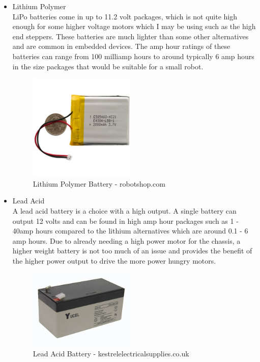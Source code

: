 \begin{itemize}
\item Lithium Polymer
\\LiPo batteries come in up to 11.2 volt packages, which is not quite high enough for some higher voltage motors which I may be using such as the high end steppers.  These batteries are much lighter than some other alternatives and are common in embedded devices.  The amp hour ratings of these batteries can range from 100 milliamp hours to around typically 6 amp hours in the size packages that would be suitable for a small robot.
\begin{figure}[H]
\centering
        \includegraphics[width=2.0in] {Images/lipo-front.jpg}
        \caption{Lithium Polymer Battery - robotshop.com}
        \label{Lithium Polymer Battery}
\end{figure}

\item Lead Acid
\\A lead acid battery is a choice with a high output.  A single battery can output 12 volts and can be found in high amp hour packages such as 1 - 40amp hours compared to the lithium alternatives which are around 0.1 - 6 amp hours.  Due to already needing a high power motor for the chassis, a higher weight battery is not too much of an issue and provides the benefit of the higher power output to drive the more power hungry motors.
\begin{figure}[H]
\centering
        \includegraphics[width=2.0in] {Images/lead-acid.jpg}
        \caption{Lead Acid Battery - kestrelelectricalsupplies.co.uk}
        \label{Lead Acid Battery}
\end{figure}
\end{itemize}

